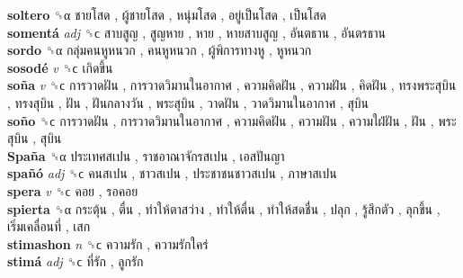 \textbf{soltero} ␝α   ชายโสด ,  ผู้ชายโสด ,  หนุ่มโสด ,  อยู่เป็นโสด ,  เป็นโสด   \\
\textbf{somentá} \emph{adj}  ␝ϲ   สาบสูญ ,  สูญหาย ,  หาย ,  หายสาบสูญ ,  อันตธาน ,  อันตรธาน   \\
\textbf{sordo} ␝α   กลุ่มคนหูหนวก ,  คนหูหนวก ,  ผู้พิการทางหู ,  หูหนวก   \\
\textbf{sosodé} \emph{v}  ␝ϲ   เกิดขึ้น   \\
\textbf{soña} \emph{v}  ␝ϲ   การวาดฝัน ,  การวาดวิมานในอากาศ ,  ความคิดฝัน ,  ความฝัน ,  คิดฝัน ,  ทรงพระสุบิน ,  ทรงสุบิน ,  ฝัน ,  ฝันกลางวัน ,  พระสุบิน ,  วาดฝัน ,  วาดวิมานในอากาศ ,  สุบิน   \\
\textbf{soño} ␝ϲ   การวาดฝัน ,  การวาดวิมานในอากาศ ,  ความคิดฝัน ,  ความฝัน ,  ความใฝ่ฝัน ,  ฝัน ,  พระสุบิน ,  สุบิน   \\
\textbf{Spaña} ␝α   ประเทศสเปน ,  ราชอาณาจักรสเปน ,  เอสปันญา   \\
\textbf{spañó} \emph{adj}  ␝ϲ   คนสเปน ,  ชาวสเปน ,  ประชาชนชาวสเปน ,  ภาษาสเปน   \\
\textbf{spera} \emph{v}  ␝ϲ   คอย ,  รอคอย   \\
\textbf{spierta} ␝α   กระตุ้น ,  ตื่น ,  ทำให้ตาสว่าง ,  ทำให้ตื่น ,  ทำให้สดชื่น ,  ปลุก ,  รู้สึกตัว ,  ลุกขึ้น ,  เริ่มเคลื่อนที่ ,  เสก   \\
\textbf{stimashon} \emph{n}  ␝ϲ   ความรัก ,  ความรักใคร่   \\
\textbf{stimá} \emph{adj}  ␝ϲ   ที่รัก ,  ลูกรัก   \\
